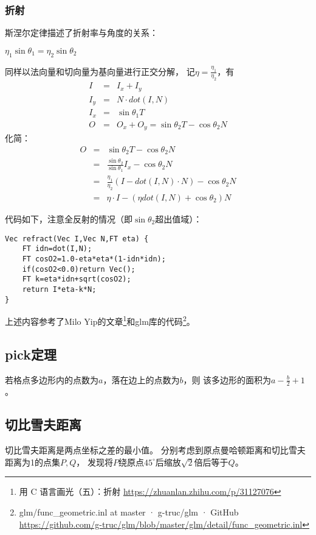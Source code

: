 \subsubsection{折射}
斯涅尔定律描述了折射率与角度的关系：
\begin{theorem}
    $\eta_1\sin \theta_1=\eta_2\sin \theta_2$
\end{theorem}
同样以法向量和切向量为基向量进行正交分解，
记$\eta=\frac{\eta_1}{\eta_2}$，有
\begin{eqnarray*}
    I&=&I_x+I_y\\
    I_y&=&N\cdot dot(I,N)\\
    I_x&=&\sin \theta_1T\\
    O&=&O_x+O_y=\sin \theta_2T-\cos \theta_2N
\end{eqnarray*}
化简：
\begin{eqnarray*}
    O&=&\sin \theta_2T-\cos \theta_2N\\
    &=&\frac{\sin \theta_2}{\sin \theta_1}I_x - \cos \theta_2 N\\
    &=&\frac{\eta_1}{\eta_2}(I-dot(I,N)\cdot N)-\cos \theta_2 N\\
    &=&\eta\cdot I-(\eta dot(I,N)+\cos \theta_2)N
\end{eqnarray*}

代码如下，注意全反射的情况（即$\sin \theta_2$超出值域）：
\begin{lstlisting}
Vec refract(Vec I,Vec N,FT eta) {
    FT idn=dot(I,N);
    FT cosO2=1.0-eta*eta*(1-idn*idn);
    if(cosO2<0.0)return Vec();
    FT k=eta*idn+sqrt(cosO2);
    return I*eta-k*N;
}
\end{lstlisting}
上述内容参考了Milo Yip的文章\footnote{
    用 C 语言画光（五）：折射
    \url{https://zhuanlan.zhihu.com/p/31127076}
}和glm库的代码\footnote{
    glm/func\_geometric.inl at master · g-truc/glm · GitHub
    \url{https://github.com/g-truc/glm/blob/master/glm/detail/func\_geometric.inl}
}。
\subsection{pick定理}
\begin{theorem}
    若格点多边形内的点数为$a$，落在边上的点数为$b$，则
    该多边形的面积为$a-\frac{b}{2}+1$。
\end{theorem}
\subsection{切比雪夫距离}
切比雪夫距离是两点坐标之差的最小值。
分别考虑到原点曼哈顿距离和切比雪夫距离为1的点集$P,Q$，
发现将$P$绕原点$45^\circ$后缩放$\sqrt{2}$倍后等于$Q$。

